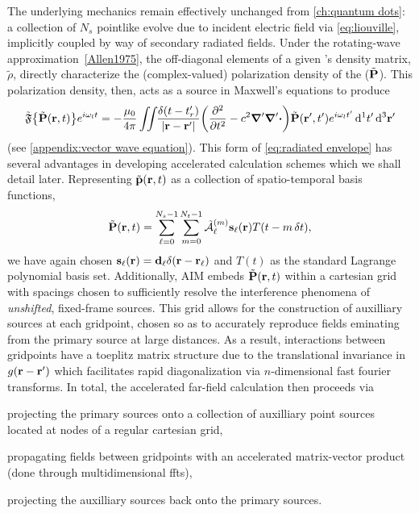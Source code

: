 The underlying mechanics remain effectively unchanged from \cref{ch:quantum dots}: a collection of $N_s$ pointlike \qds{} evolve due to incident electric field via \cref{eq:liouville}, implicitly coupled by way of secondary radiated fields.
Under the rotating-wave approximation~\cref{Allen1975}, the off-diagonal elements of a given \qd's density matrix, $\tilde{\rho}$, directly characterize the (complex-valued) polarization density of the \qd{} ($\tilde{\vb{P}}$).
This polarization density, then, acts as a source in Maxwell's equations to produce
\begin{equation}
  \tilde{\mathfrak{F}}\qty{\tilde{\vb{P}}(\vb{r}, t)}e^{i \omega_l t} = -\frac{\mu_0}{4\pi} \iint_{} \kern0.1em \frac{\delta(t - t'_r)}{\abs{\vb{r} - \vb{r}'}} \qty(\pdv[2]{t} - c^2 \grad' \grad'\boldsymbol{\cdot}) \tilde{\vb{P}}(\vb{r}', t') e^{i \omega_l t'} \dd[1]{t'} \dd[3]{\vb{r}'}
  \label{eq:envelope propagator}
\end{equation}
(see \cref{appendix:vector wave equation}).
This form of \cref{eq:radiated envelope} has several advantages in developing accelerated calculation schemes which we shall detail later.
Representing $\tilde{\vb{p}}(\vb{r}, t)$ as a collection of spatio-temporal basis functions,
\begin{equation}
  \tilde{\vb{P}}(\vb{r}, t) = \sum_{\ell = 0}^{N_s - 1} \sum_{m = 0}^{N_t - 1} \tilde{\mathcal{A}}_\ell^{(m)} \vb{s}_\ell(\vb{r}) T(t - m \, \delta t),
\end{equation}
we have again chosen $\vb{s}_\ell(\vb{r}) = \vb{d}_\ell \delta(\vb{r} - \vb{r}_\ell)$ and $T(t)$ as the standard Lagrange polynomial basis set.
Additionally, AIM embeds $\tilde{\vb{P}}(\vb{r}, t)$ within a cartesian grid with spacings chosen to sufficiently resolve the interference phenomena of \emph{unshifted}, fixed-frame sources.
This grid allows for the construction of auxilliary sources at each gridpoint, chosen so as to accurately reproduce fields eminating from the primary source at large distances.
As a result, interactions between gridpoints have a toeplitz matrix structure due to the translational invariance in $g(\vb{r} - \vb{r}')$ which facilitates rapid diagonalization via $n$-dimensional fast fourier transforms.
In total, the accelerated far-field calculation then proceeds via
\begin{inparaenum}[(i)]
  \item projecting the primary sources onto a collection of auxilliary point sources located at nodes of a regular cartesian grid,
  \item propagating fields between gridpoints with an accelerated matrix-vector product (done through multidimensional ffts),
  \item projecting the auxilliary sources back onto the primary sources.
\end{inparaenum}

